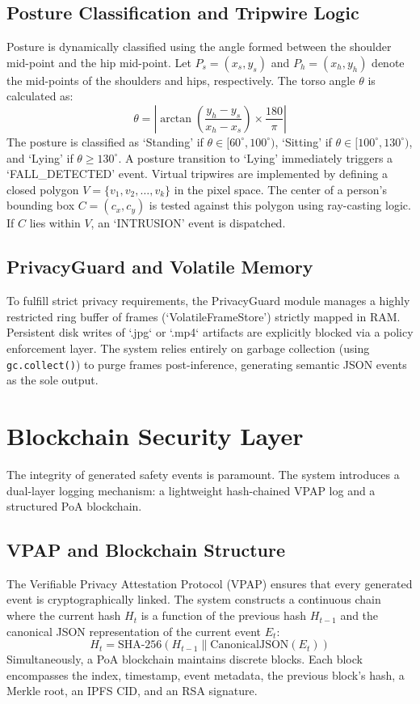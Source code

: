 \documentclass[conference]{IEEEtran}
\begin{document}
\subsection{Posture Classification and Tripwire Logic}
Posture is dynamically classified using the angle formed between the shoulder mid-point and the hip mid-point. Let $P_{s} = (x_{s}, y_{s})$ and $P_{h} = (x_{h}, y_{h})$ denote the mid-points of the shoulders and hips, respectively. The torso angle $\theta$ is calculated as:
\begin{equation}
    \theta = \left| \arctan\left(\frac{y_{h} - y_{s}}{x_{h} - x_{s}}\right) \times \frac{180}{\pi} \right|
\end{equation}
The posture is classified as `Standing' if $\theta \in [60^\circ, 100^\circ)$, `Sitting' if $\theta \in [100^\circ, 130^\circ)$, and `Lying' if $\theta \geq 130^\circ$. A posture transition to `Lying' immediately triggers a `FALL\_DETECTED' event.
Virtual tripwires are implemented by defining a closed polygon $V = \{v_1, v_2, \dots, v_k\}$ in the pixel space. The center of a person's bounding box $C = (c_x, c_y)$ is tested against this polygon using ray-casting logic. If $C$ lies within $V$, an `INTRUSION' event is dispatched.

\subsection{PrivacyGuard and Volatile Memory}
To fulfill strict privacy requirements, the PrivacyGuard module manages a highly restricted ring buffer of frames (`VolatileFrameStore') strictly mapped in RAM. Persistent disk writes of `.jpg` or `.mp4` artifacts are explicitly blocked via a policy enforcement layer. The system relies entirely on garbage collection (using \texttt{gc.collect()}) to purge frames post-inference, generating semantic JSON events as the sole output.

\section{Blockchain Security Layer}

The integrity of generated safety events is paramount. The system introduces a dual-layer logging mechanism: a lightweight hash-chained VPAP log and a structured PoA blockchain.

\subsection{VPAP and Blockchain Structure}
The Verifiable Privacy Attestation Protocol (VPAP) ensures that every generated event is cryptographically linked. The system constructs a continuous chain where the current hash $H_t$ is a function of the previous hash $H_{t-1}$ and the canonical JSON representation of the current event $E_t$:
\begin{equation}
    H_t = \text{SHA-256}(H_{t-1} \parallel \text{CanonicalJSON}(E_t))
\end{equation}
Simultaneously, a PoA blockchain maintains discrete blocks. Each block encompasses the index, timestamp, event metadata, the previous block's hash, a Merkle root, an IPFS CID, and an RSA signature. 
\end{document}
